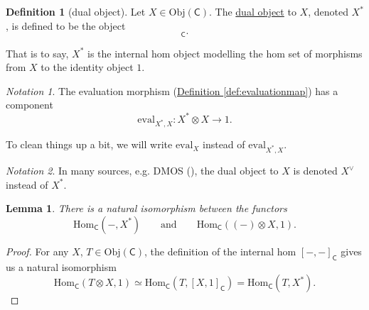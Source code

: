 \documentclass[a4paper,10pt]{scrreprt}
\newcommand{\defn}[1]{\ul{#1}}
\newcommand{\Obj}{\mathrm{Obj}}
\newcommand{\Hom}{\mathrm{Hom}}
\newcommand{\ev}{\mathrm{eval}}
\theoremstyle{definition}
\newtheorem{definition}{Definition}[section]
\theoremstyle{plain}
\newtheorem{lemma}{Lemma}[section]
\theoremstyle{remark}
\newtheorem{notation}{Notation}[section]
\begin{document}
\begin{definition}[dual object]
  \label{def:dualobject}
  Let $X \in \Obj(\mathsf{C})$. The \defn{dual object} to $X$, denoted $X^{*}$, is defined to be the object
  \begin{equation*}
    [X, 1]_{\mathsf{C}}.
  \end{equation*}

  That is to say, $X^{*}$ is the internal hom object modelling the hom set of morphisms from $X$ to the identity object $1$.
\end{definition}

\begin{notation}
  The evaluation morphism (\hyperref[def:evaluationmap]{Definition \ref*{def:evaluationmap}}) has a component
  \begin{equation*}
    \ev_{X^{*}, X}\colon X^{*} \otimes X \to 1.
  \end{equation*}

  To clean things up a bit, we will write $\ev_{X}$ instead of $\ev_{X^{*}, X}$.
\end{notation}

\begin{notation}
  In many sources, e.g. DMOS (\cite{DMOS}), the dual object to $X$ is denoted $X^{\vee}$ instead of $X^{*}$.
\end{notation}

\begin{lemma}
  There is a natural isomorphism between the functors
  \begin{equation*}
    \Hom_{\mathsf{C}}(-, X^{*})\qquad\text{and}\qquad \Hom_{\mathsf{C}}((-) \otimes X, 1).
  \end{equation*}
\end{lemma}
\begin{proof}
  For any $X$, $T \in \Obj(\mathsf{C})$, the definition of the internal hom $[-,-]_{\mathsf{C}}$ gives us a natural isomorphism
  \begin{equation*}
    \Hom_{\mathsf{C}}(T \otimes X, 1) \simeq \Hom_{\mathsf{C}}(T, [X, 1]_{\mathsf{C}}) = \Hom_{\mathsf{C}}(T, X^{*}).
  \end{equation*}
\end{proof}
\end{document}
